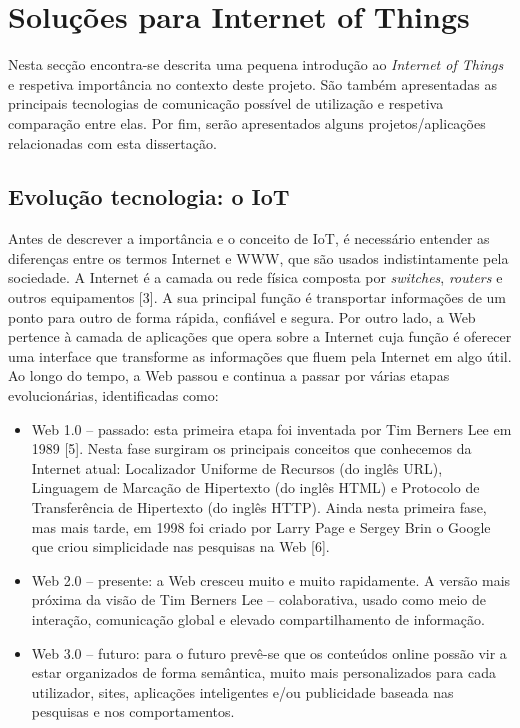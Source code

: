 
\chapter{Soluções para Internet of Things}

Nesta secção encontra-se descrita uma pequena introdução ao \textit{Internet of Things} e respetiva importância no contexto deste projeto. São também apresentadas as principais tecnologias de comunicação possível de utilização e respetiva comparação entre elas. Por fim, serão apresentados alguns projetos/aplicações relacionadas com esta dissertação.  





\section{Evolução tecnologia: o IoT}


Antes de descrever a importância e o conceito de \ac{IoT}, é necessário entender as diferenças entre os termos Internet e \ac{WWW}, que são usados indistintamente pela sociedade. A Internet é a camada ou rede física composta por \textit{switches}, \textit{routers} e outros equipamentos [3]. A sua principal função é transportar informações de um ponto para outro de forma rápida, confiável e segura. Por outro lado, a Web pertence à camada de aplicações que opera sobre a Internet cuja função é oferecer uma interface que transforme as informações que fluem pela Internet em algo útil. Ao longo do tempo, a Web passou e continua a passar por várias etapas evolucionárias, identificadas como:

\begin{itemize}
	\item Web 1.0 – passado: esta primeira etapa foi inventada por Tim Berners Lee em 1989 [5]. Nesta fase surgiram os principais conceitos que conhecemos da Internet atual: Localizador Uniforme de Recursos (do inglês \ac{URL}), Linguagem de Marcação de Hipertexto (do inglês \ac{HTML}) e Protocolo de Transferência de Hipertexto (do inglês \ac{HTTP}). Ainda nesta primeira fase, mas mais tarde, em 1998 foi criado por Larry Page e Sergey Brin o Google que criou simplicidade nas pesquisas na Web [6]. 
	
	\item Web 2.0 – presente: a Web cresceu muito e muito rapidamente. A versão mais próxima da visão de Tim Berners Lee – colaborativa, usado como meio de interação, comunicação global e elevado compartilhamento de informação. 
	
	\item Web 3.0 – futuro: para o futuro prevê-se que os conteúdos online possão vir a estar organizados de forma semântica, muito mais personalizados para cada utilizador, sites, aplicações inteligentes e/ou publicidade baseada nas pesquisas e nos comportamentos.
\end{itemize}

